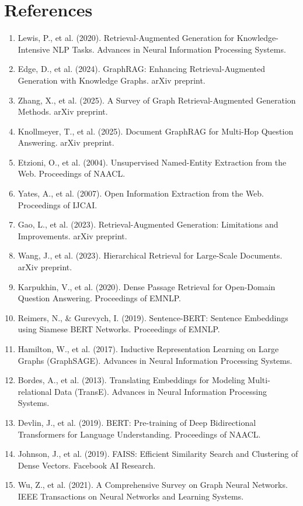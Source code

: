 \documentclass[10pt]{article}
\begin{document}
\section*{References}
\begin{enumerate}[leftmargin=*,label={\arabic*.}]
\item Lewis, P., et al. (2020). Retrieval-Augmented Generation for Knowledge-Intensive NLP Tasks. Advances in Neural Information Processing Systems.
\item Edge, D., et al. (2024). GraphRAG: Enhancing Retrieval-Augmented Generation with Knowledge Graphs. arXiv preprint.
\item Zhang, X., et al. (2025). A Survey of Graph Retrieval-Augmented Generation Methods. arXiv preprint.
\item Knollmeyer, T., et al. (2025). Document GraphRAG for Multi-Hop Question Answering. arXiv preprint.
\item Etzioni, O., et al. (2004). Unsupervised Named-Entity Extraction from the Web. Proceedings of NAACL.
\item Yates, A., et al. (2007). Open Information Extraction from the Web. Proceedings of IJCAI.
\item Gao, L., et al. (2023). Retrieval-Augmented Generation: Limitations and Improvements. arXiv preprint.
\item Wang, J., et al. (2023). Hierarchical Retrieval for Large-Scale Documents. arXiv preprint.
\item Karpukhin, V., et al. (2020). Dense Passage Retrieval for Open-Domain Question Answering. Proceedings of EMNLP.
\item Reimers, N., \& Gurevych, I. (2019). Sentence-BERT: Sentence Embeddings using Siamese BERT Networks. Proceedings of EMNLP.
\item Hamilton, W., et al. (2017). Inductive Representation Learning on Large Graphs (GraphSAGE). Advances in Neural Information Processing Systems.
\item Bordes, A., et al. (2013). Translating Embeddings for Modeling Multi-relational Data (TransE). Advances in Neural Information Processing Systems.
\item Devlin, J., et al. (2019). BERT: Pre-training of Deep Bidirectional Transformers for Language Understanding. Proceedings of NAACL.
\item Johnson, J., et al. (2019). FAISS: Efficient Similarity Search and Clustering of Dense Vectors. Facebook AI Research.
\item Wu, Z., et al. (2021). A Comprehensive Survey on Graph Neural Networks. IEEE Transactions on Neural Networks and Learning Systems.

\end{enumerate}
\end{document}
